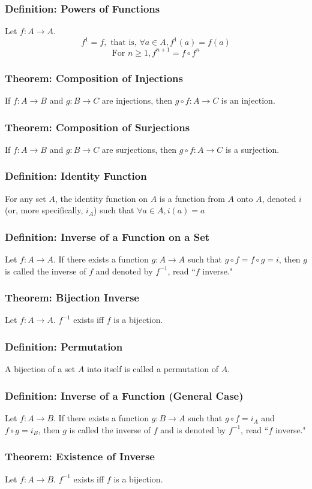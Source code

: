 \documentclass{article}
\begin{document}
\subsubsection*{Definition: Powers of Functions}
Let $f: A \rightarrow A$. 
$$f^1 = f, \text{ that is, }\forall a \in A, f^1 (a) = f(a)$$
$$\text{For } n \geq 1, f^{n+1} = f \circ f^n$$

\subsubsection*{Theorem: Composition of Injections}
If $f: A \rightarrow B$ and $g: B \rightarrow C$ are injections, then $g \circ f : A \rightarrow C$ is an injection.

\subsubsection*{Theorem: Composition of Surjections}
If $f: A \rightarrow B$ and $g: B \rightarrow C$ are surjections, then $g \circ f: A \rightarrow C$ is a surjection. 

\subsubsection*{Definition: Identity Function}
For any set $A$, the identity function on $A$ is a function from $A$ onto $A$, denoted $i$ (or, more specifically, $i_A$) such that $\forall a \in A, i(a) = a$ 

\subsubsection*{Definition: Inverse of a Function on a Set}
Let $f: A \rightarrow A$. If there exists a function $g: A \rightarrow A$ such that $g \circ f = f \circ g = i$, then $g$ is called the inverse of $f$ and denoted by $f^{-1}$, read ``$f$ inverse."

\subsubsection*{Theorem: Bijection Inverse}
Let $f: A \rightarrow A$. $f^{-1}$ exists iff $f$ is a bijection. 

\subsubsection*{Definition: Permutation}
A bijection of a set $A$ into itself is called a permutation of $A$. 

\subsubsection*{Definition: Inverse of a Function (General Case)}
Let $f: A \rightarrow B$. If there exists a function $g: B \rightarrow A$ such that $g \circ f = i_A$ and $f \circ g = i_B$, then $g$ is called the inverse of $f$ and is denoted by $f^{-1}$, read ``$f$ inverse."

\subsubsection*{Theorem: Existence of Inverse}
Let $f: A \rightarrow B$. $f^{-1}$ exists iff $f$ is a bijection. 
\end{document}
